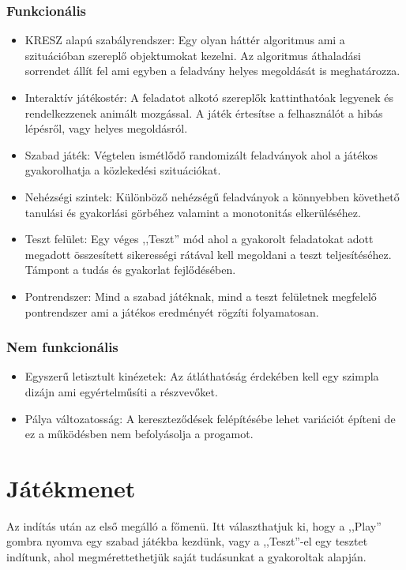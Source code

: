 \documentclass[
]{thesis-ekf}
\theoremstyle{definition}
\theoremstyle{remark}
\begin{document}
\subsection{Funkcionális}
\begin{itemize}
	\item KRESZ alapú szabályrendszer: Egy olyan háttér algoritmus ami a szituációban szereplő objektumokat kezelni. Az algoritmus áthaladási sorrendet állít fel ami egyben a feladvány helyes megoldását is meghatározza. 
	\item Interaktív játékostér: A feladatot alkotó szereplők kattinthatóak legyenek és rendelkezzenek animált mozgással. A játék értesítse a felhasználót a hibás lépésről, vagy helyes megoldásról.	
	\item Szabad játék: Végtelen ismétlődő randomizált feladványok ahol a játékos gyakorolhatja a közlekedési szituációkat.
	\item Nehézségi szintek: Különböző nehézségű feladványok a könnyebben követhető tanulási és gyakorlási görbéhez valamint a monotonitás elkerüléséhez.
	\item Teszt felület: Egy véges ,,Teszt'' mód ahol a gyakorolt feladatokat adott megadott összesített sikerességi rátával kell megoldani a teszt teljesítéséhez. Támpont a tudás és gyakorlat fejlődésében. 
	\item Pontrendszer: Mind a szabad játéknak, mind a teszt felületnek megfelelő pontrendszer ami a játékos eredményét rögzíti folyamatosan.
\end{itemize}

\subsection{Nem funkcionális}
\begin{itemize}
	\item Egyszerű letisztult kinézetek: Az átláthatóság érdekében kell egy szimpla dizájn ami egyértelműsíti a részvevőket.
	\item Pálya változatosság: A kereszteződések felépítésébe lehet variációt építeni de ez a működésben nem befolyásolja a progamot.
\end{itemize}
\chapter{Játékmenet}
Az indítás után az első megálló a főmenü. Itt választhatjuk ki, hogy a ,,Play'' gombra nyomva egy szabad játékba kezdünk, vagy a ,,Teszt''-el egy tesztet indítunk, ahol megmérettethetjük saját tudásunkat a gyakoroltak alapján.
\end{document}
